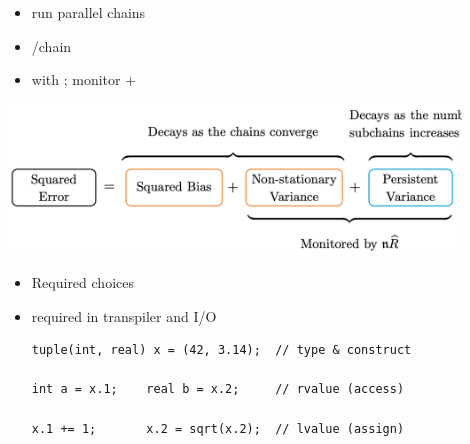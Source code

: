 \documentclass[9pt]{report}
\begin{document}
\begin{itemize}
\item {} run  parallel chains
\item {}/chain 
\item {} with ; monitor  + 
\end{itemize}
\begin{center}
  \includegraphics[width=0.9\textwidth]{img/nRhat.png}
\end{center}




\vfill 
\begin{center}
  {\Huge {}}
\end{center}
\vfill 
\vfill 

\begin{itemize}
\item Required  choices
\item {} required in transpiler and I/O
\begin{verbatim}
tuple(int, real) x = (42, 3.14);  // type & construct

int a = x.1;    real b = x.2;     // rvalue (access)

x.1 += 1;       x.2 = sqrt(x.2);  // lvalue (assign)
\end{verbatim}
\end{itemize}
\end{document}
